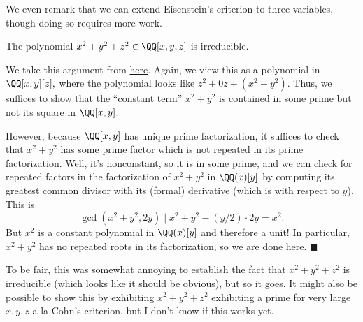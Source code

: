 We even remark that we can extend Eisenstein's criterion to three variables, though doing so requires more work.
\begin{proposition}
    The polynomial $x^2+y^2+z^2\in\QQ[x,y,z]$ is irreducible.
\end{proposition}
We take this argument from \href{http://www-users.math.umn.edu/~garrett/m/algebra/notes/16.pdf}{here}. Again, we view this as a polynomial in $\QQ[x,y][z],$ where the polynomial looks like $z^2+0z+\left(x^2+y^2\right).$ Thus, we suffices to show that the ``constant term'' $x^2+y^2$ is contained in some prime but not its square in $\QQ[x,y].$

However, because $\QQ[x,y]$ has unique prime factorization, it suffices to check that $x^2+y^2$ has some prime factor which is not repeated in its prime factorization. Well, it's nonconstant, so it is in some prime, and we can check for repeated factors in the factorization of $x^2+y^2$ in $\QQ(x)[y]$ by computing its greatest common divisor with its (formal) derivative (which is with respect to $y$). This is
\[\gcd\left(x^2+y^2,2y\right)\mid x^2+y^2-(y/2)\cdot2y=x^2.\]
But $x^2$ is a constant polynomial in $\QQ(x)[y]$ and therefore a unit! In particular, $x^2+y^2$ has no repeated roots in its factorization, so we are done here. $\blacksquare$

To be fair, this was somewhat annoying to establish the fact that $x^2+y^2+z^2$ is irreducible (which looks like it should be obvious), but so it goes. It might also be possible to show this by exhibiting $x^2+y^2+z^2$ exhibiting a prime for very large $x,y,z$ a la Cohn's criterion, but I don't know if this works yet.

